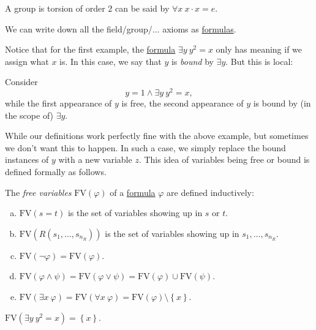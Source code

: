 \begin{eg}
	A group is torsion of order \(2\) can be said by \(\forall x\ x\cdot x = e\).
\end{eg}

\begin{eg}
	We can write down all the field/group/... axioms as \hyperref[def:formula]{formulas}.
\end{eg}

Notice that for the first example, the \hyperref[def:formula]{formula} \(\exists y\ y^2 = x\) only has meaning if we assign what \(x\) is. In this case, we say that \(y\) is \emph{bound} by \(\exists y\). But this is local:

\begin{eg}
	Consider
	\[
		y=1 \land \exists y\ y^2 = x,
	\]
	while the first appearance of \(y\) is free, the second appearance of \(y\) is bound by (in the scope of) \(\exists y\).
\end{eg}

While our definitions work perfectly fine with the above example, but sometimes we don't want this to happen. In such a case, we simply replace the bound instances of \(y\) with a new variable \(z\). This idea of variables being free or bound is defined formally as follows.

\begin{definition}\label{def:free-variable}
	The \emph{free variables} \(\mathrm{FV}(\varphi )\) of a \hyperref[def:formula]{formula} \(\varphi \) are defined inductively:
	\begin{enumerate}[(a)]
		\item \(\mathrm{FV}(s=t) \) is the set of variables showing up in \(s\) or \(t\).
		\item \(\mathrm{FV}(R(s_1, \ldots , s_{n_R})) \) is the set of variables showing up in \(s_1, \ldots , s_{n_R}\).
		\item \(\mathrm{FV}(\lnot \varphi ) = \mathrm{FV} (\varphi )\).
		\item \(\mathrm{FV} (\varphi \land \psi ) = \mathrm{FV} (\varphi \lor \psi ) = \mathrm{FV}(\varphi ) \cup \mathrm{FV} (\psi ) \).
		\item \(\mathrm{FV} (\exists x\ \varphi ) = \mathrm{FV} (\forall x\ \varphi ) = \mathrm{FV} (\varphi ) \setminus \left\{ x \right\} \).
	\end{enumerate}
\end{definition}

\begin{eg}
	\(\mathrm{FV} (\exists y\ y^2 = x) = \left\{ x \right\} \).
\end{eg}

